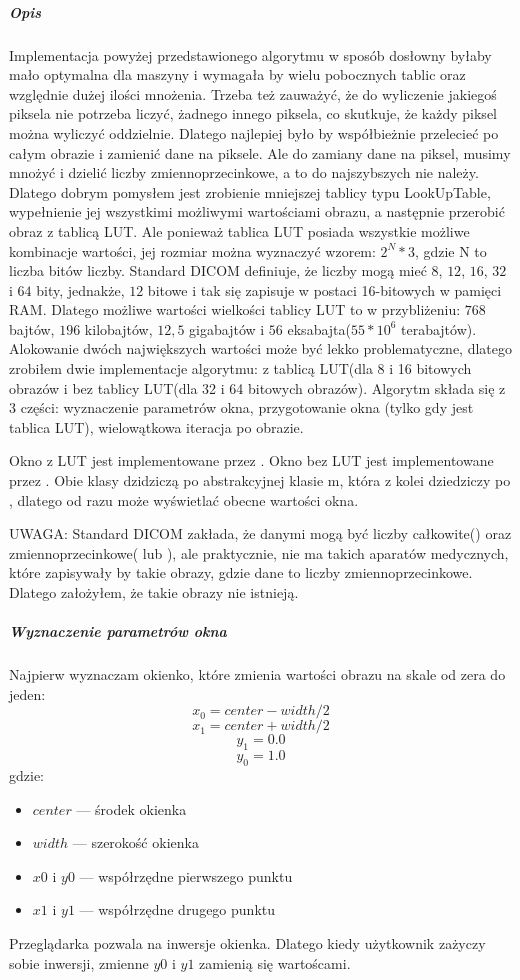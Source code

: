 \subparagraph{Opis}
\par
Implementacja powyżej przedstawionego algorytmu w sposób dosłowny byłaby mało optymalna dla maszyny i wymagała by wielu pobocznych tablic oraz względnie dużej ilości mnożenia.
Trzeba też zauważyć, że do wyliczenie jakiegoś piksela nie potrzeba liczyć, żadnego innego piksela, co skutkuje, że każdy piksel można wyliczyć oddzielnie.
Dlatego najlepiej było by współbieżnie przelecieć po całym obrazie i zamienić dane na piksele.
Ale do zamiany dane na piksel, musimy mnożyć i dzielić liczby zmiennoprzecinkowe, a to do najszybszych nie należy.
Dlatego dobrym pomysłem jest zrobienie mniejszej tablicy typu LookUpTable, wypełnienie jej wszystkimi możliwymi wartościami obrazu, a następnie przerobić obraz z tablicą LUT.
Ale ponieważ tablica LUT posiada wszystkie możliwe kombinacje wartości, jej rozmiar można wyznaczyć wzorem: $2^N*3$, gdzie N to liczba bitów liczby.
Standard DICOM definiuje, że liczby mogą mieć $8$, $12$, $16$, $32$ i $64$ bity, jednakże, $12$ bitowe i tak się zapisuje w postaci 16-bitowych w pamięci RAM.
Dlatego możliwe wartości wielkości tablicy LUT to w przybliżeniu: $768$ bajtów, $196$ kilobajtów, $12,5$ gigabajtów i $56$ eksabajta($55*10^{6}$ terabajtów).
Alokowanie dwóch największych wartości może być lekko problematyczne, dlatego zrobiłem dwie implementacje algorytmu: z tablicą LUT(dla 8 i 16 bitowych obrazów i bez tablicy LUT(dla 32 i 64 bitowych obrazów).
Algorytm składa się z 3 części: wyznaczenie parametrów okna, przygotowanie okna (tylko gdy jest tablica LUT), wielowątkowa iteracja po obrazie.
\par
Okno z LUT jest implementowane przez .
Okno bez LUT jest implementowane przez .
Obie klasy dzidziczą po abstrakcyjnej klasie m, która z kolei dziedziczy po , dlatego od razu może wyświetlać obecne wartości okna.
\par
UWAGA: Standard DICOM zakłada, że danymi mogą być liczby całkowite() oraz zmiennoprzecinkowe( lub ), ale praktycznie, nie ma takich aparatów medycznych, które zapisywały by takie obrazy, gdzie dane to liczby zmiennoprzecinkowe. Dlatego założyłem, że takie obrazy nie istnieją.

\subparagraph{Wyznaczenie parametrów okna}
\par
Najpierw wyznaczam okienko, które zmienia wartości obrazu na skale od zera do jeden:
\[x_0 = center - width / 2\]
\[x_1 = center + width / 2\]
\[y_1 = 0.0\]
\[y_0 = 1.0\]
gdzie:
\begin{itemize}
    \item $center$ --- środek okienka
    \item $width$ --- szerokość okienka
    \item $x0$ i $y0$ --- współrzędne pierwszego punktu
    \item $x1$ i $y1$ --- współrzędne drugego punktu
\end{itemize}
Przeglądarka pozwala na inwersje okienka.
Dlatego kiedy użytkownik zażyczy sobie inwersji, zmienne $y0$ i $y1$ zamienią się wartoścami.

